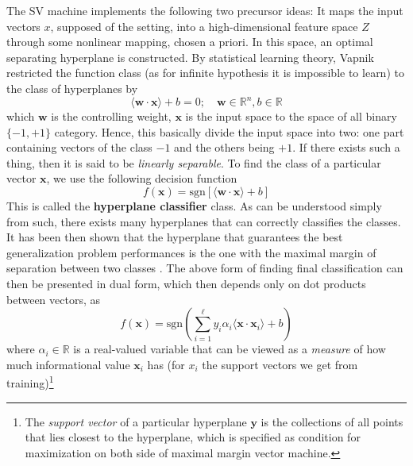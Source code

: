 The SV machine implements the following two precursor ideas: It maps the input vectors $x$, supposed of the setting, into a high-dimensional feature space $Z$ through some nonlinear mapping, chosen a priori. In this space, an optimal separating hyperplane is constructed. By statistical learning theory, Vapnik restricted the function class (as for infinite hypothesis it is impossible to learn) to the class of hyperplanes by 
\begin{equation}
    \langle \mathbf{w}\cdot \mathbf{x} \rangle + b = 0 ; \quad \mathbf{w}\in \mathbb{R}^{n} , b\in \mathbb{R}
\end{equation}
which $\mathbf{w}$ is the controlling weight, $\mathbf{x}$ is the input space to the space of all binary $\{-1,+1\}$ category. Hence, this basically divide the input space into two: one part containing vectors of the class $-1$ and the others being $+1$. If there exists such a thing, then it is said to be \textit{linearly separable}. To find the class of a particular vector $\mathbf{x}$, we use the following decision function 
\begin{equation}
    f(\mathbf{x}) = \mathrm{sgn}[\langle \mathbf{w}\cdot \mathbf{x}\rangle+ b]
\end{equation}
This is called the \textbf{hyperplane classifier} class. As can be understood simply from such, there exists many hyperplanes that can correctly classifies the classes. It has been then shown that the hyperplane that guarantees the best generalization problem performances is the one with the maximal margin of separation between two classes \cite{Cristianini2000AnIT}. The above form of finding final classification can then be presented in dual form, which then depends only on dot products between vectors, as 
\begin{equation}
    f(\mathbf{x}) = \mathrm{sgn}\left(\sum^{\ell}_{i=1} y_{i}\alpha_{i} \langle \mathbf{x}\cdot \mathbf{x}_{i} \rangle+ b\right)
\end{equation} where $\alpha_{i}\in \mathbb{R}$ is a real-valued variable that can be viewed as a \textit{measure} of how much informational value $\mathbf{x}_{i}$ has (for $x_{i}$ the support vectors we get from training)\footnote{The \textit{support vector} of a particular hyperplane $\mathbf{y}$ is the collections of all points that lies closest to the hyperplane, which is specified as condition for maximization on both side of maximal margin vector machine.}

